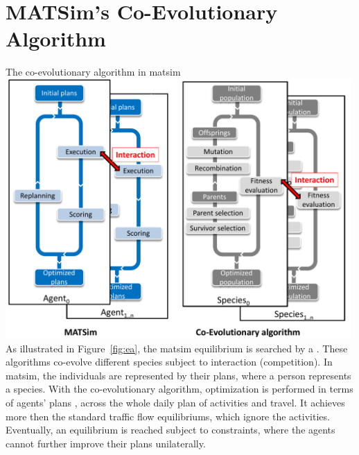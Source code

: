 \section{MATSim's Co-Evolutionary Algorithm}
\label{sec:co-ev}
%
%
{The co-evolutionary algorithm in \protect\gls{matsim}
%
%
}%
{\label{fig:ea}}%
{\includegraphics[width=0.99\textwidth, angle=0]{using/figures/MATSimVSea.pdf}}%
{}
%
%
As illustrated in Figure~\ref{fig:ea}, the \gls{matsim} equilibrium is searched by a \emph{} \citep[see e.g.,][]{PopoviciEtAl_2012}. These \glspl{algorithm} co-evolve different species subject to interaction (\eg competition). In \gls{matsim}, the individuals are represented by their plans, where a person represents a species. With the co-evolutionary algorithm, optimization is performed in terms of agents' plans , \ie across the whole daily plan of activities and travel. It achieves more then the standard traffic flow \glspl{equilibrium}, which ignore the activities. Eventually, an equilibrium is reached subject to constraints, where the agents cannot further improve their plans unilaterally. 

